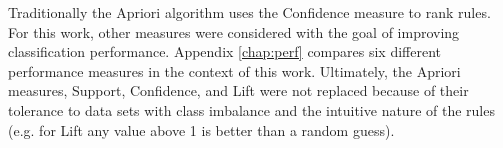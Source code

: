 



Traditionally the Apriori algorithm uses the Confidence measure to rank rules. For this work, other measures were considered with the goal of improving classification performance. Appendix \ref{chap:perf} compares six different performance measures in the context of this work. Ultimately, the Apriori measures, Support, Confidence, and Lift were not replaced because of their tolerance to data sets with class imbalance and the intuitive nature of the rules (e.g. for Lift any value above 1 is better than a random guess).





